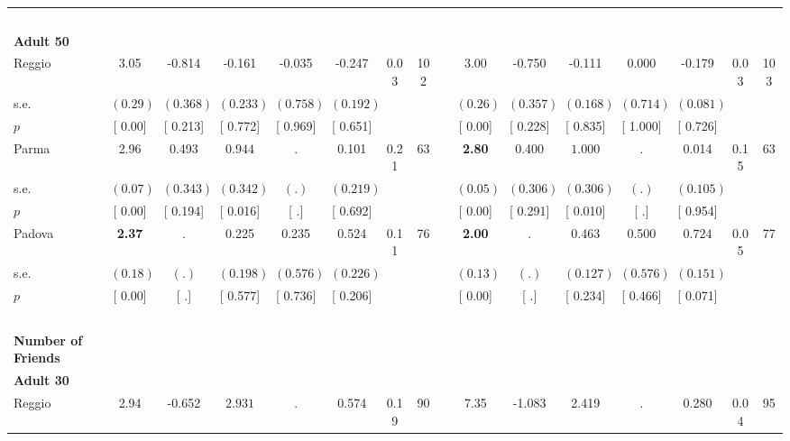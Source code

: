 \begin{longtable}{L{8em} c c c c c c c p{1em} c c c c c c c}
~\\[1em]
\quad \quad \textbf{Adult 50} & & & & & & & & & & & & & & & \\* 
\quad \quad \quad Reggio& 3.05 &    -0.814 &    -0.161 &    -0.035 &    -0.247 &      0.03 &       102 & & 3.00 &    -0.750 &    -0.111 &     0.000 &    -0.179 &      0.03 &       103  \\*
\quad \quad \quad \quad s.e.& $ (     0.29)$ & $ (    0.368)$ & $ (    0.233)$ & $ (    0.758)$ & $ (    0.192)$ & & & & $ (     0.26)$ & $ (    0.357)$ & $ (    0.168)$ & $ (    0.714)$ & $ (    0.081)$ & &  \\*
\quad \quad \quad \quad $ p$ & [     0.00] & [    0.213] & [    0.772] & [    0.969] & [    0.651] & & & & [     0.00] & [    0.228] & [    0.835] & [    1.000] & [    0.726] & &  \\[1em]
\quad \quad \quad Parma& 2.96 &     0.493 & $ \mathbf{    0.944}$ &         . &     0.101 &      0.21 &        63 & & \textbf{     2.80} &     0.400 & $ \mathbf{    1.000}$ &         . &     0.014 &      0.15 &        63  \\*
\quad \quad \quad \quad s.e.& $ (     0.07)$ & $ (    0.343)$ & $ (    0.342)$ & $ (        .)$ & $ (    0.219)$ & & & & $ (     0.05)$ & $ (    0.306)$ & $ (    0.306)$ & $ (        .)$ & $ (    0.105)$ & &  \\*
\quad \quad \quad \quad $ p$ & [     0.00] & [    0.194] & [    0.016] & [        .] & [    0.692] & & & & [     0.00] & [    0.291] & [    0.010] & [        .] & [    0.954] & &  \\[1em]
\quad \quad \quad Padova& \textbf{     2.37} &         . &     0.225 &     0.235 &     0.524 &      0.11 &        76 & & \textbf{     2.00} &         . &     0.463 &     0.500 & $ \mathbf{    0.724}$ &      0.05 &        77  \\*
\quad \quad \quad \quad s.e.& $ (     0.18)$ & $ (        .)$ & $ (    0.198)$ & $ (    0.576)$ & $ (    0.226)$ & & & & $ (     0.13)$ & $ (        .)$ & $ (    0.127)$ & $ (    0.576)$ & $ (    0.151)$ & &  \\*
\quad \quad \quad \quad $ p$ & [     0.00] & [        .] & [    0.577] & [    0.736] & [    0.206] & & & & [     0.00] & [        .] & [    0.234] & [    0.466] & [    0.071] & &  \\[1em]
~\\[1em]
\textbf{Number of Friends} \\*
\quad \quad \textbf{Adult 30} & & & & & & & & & & & & & & & \\* 
\quad \quad \quad Reggio& 2.94 &    -0.652 & $ \mathbf{    2.931}$ &         . &     0.574 &      0.19 &        90 & & 7.35 &    -1.083 &     2.419 &         . &     0.280 &      0.04 &        95  \\*

\end{longtable}
